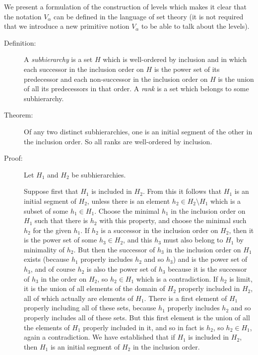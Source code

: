 \documentclass[12pt]{book}
\begin{document}
We present a formulation of the construction of levels which makes it clear that the notation $V_{\alpha}$ can be defined in the language of set theory (it is not required
that we introduce a new primitive notion $V_{\alpha}$ to be able to talk about the levels).

\begin{description}

\item[Definition:] A {\em subhierarchy\/} is a set $H$ which is
well-ordered by inclusion and in which each successor in the inclusion
order on $H$ is the power set of its predecessor and each non-successor in the
inclusion order on $H$ is the union of all its predecessors in that
order.  A {\em rank\/} is a set which belongs to some subhierarchy.

\item[Theorem:] Of any two distinct subhierarchies, one is an initial
segment of the other in the inclusion order.  So all ranks are
well-ordered by inclusion.

\item[Proof:]  Let $H_1$ and $H_2$ be subhierarchies.

Suppose first that $H_1$ is included in $H_2$.  From this it follows that $H_1$ is an initial segment of $H_2$, unless there is an element
$h_2 \in H_2\setminus H_1$ which is a subset of some $h_1 \in H_1$.  Choose the minimal $h_1$ in the inclusion order on $H_1$ such that
there is $h_2$ with this property, and choose the minimal such $h_2$ for the given $h_1$.  If $h_2$ is a successor in the inclusion order on
$H_2$, then it is the power set of some $h_3 \in H_2$, and this $h_3$ must also belong to $H_1$ by minimality of $h_2$.  But then the successor
of $h_3$ in the inclusion order on $H_1$ exists (because $h_1$ properly includes $h_2$ and so $h_3$) and is the power set of $h_3$,
and of course $h_2$ is also the power set of $h_3$ because it is the successor of $h_3$ in the order on $H_2$, so $h_2 \in H_1$ which is a contradiction.  If $h_2$ is limit, it is the union of all elements of the domain of $H_2$ properly included in $H_2$, all of which actually are elements of $H_1$.  There is a first element of $H_1$ properly including all of these sets, because $h_1$ properly includes $h_2$ and so properly includes all of these sets.  But this first element is the union of all the elements of $H_1$ properly included in it, and so in fact is $h_2$, so $h_2 \in H_1$, again a contradiction.  We have established that if $H_1$ is included in $H_2$, then $H_1$ is an initial segment of $H_2$ in the inclusion order.


\end{description}
\end{document}
